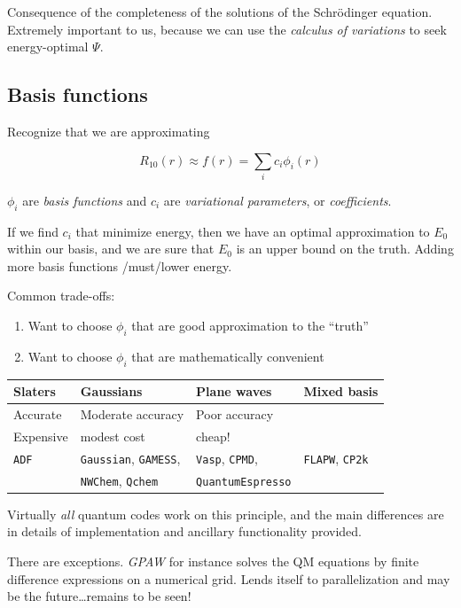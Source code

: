 \documentclass[11pt]{article}
\begin{document}
Consequence of the completeness of the solutions of the Schr\"{o}dinger equation.  Extremely important to us, because we can use the \emph{calculus of variations} to seek energy-optimal \(\Psi\).

\subsection{Basis functions}
\label{sec:org78bfcad}
Recognize that we are approximating

\[R_{10}(r) \approx f(r) = \sum_i c_i \phi_i(r)\]

\(\phi_i\) are \emph{basis functions} and \(c_i\) are \emph{variational parameters}, or \emph{coefficients}.

If we find \(c_i\) that minimize energy, then we have an optimal approximation to \(E_0\) within our basis, and we are sure that \(E_0\) is an upper bound on the truth.  Adding more basis functions /must/lower energy.

Common trade-offs:
\begin{enumerate}
\item Want to choose \(\phi_i\) that are good approximation to the ``truth''
\item Want to choose \(\phi_i\) that are mathematically convenient
\end{enumerate}

\begin{center}
\begin{tabular}{llll}
Slaters & Gaussians & Plane waves & Mixed basis\\
\hline
Accurate & Moderate accuracy & Poor accuracy & \\
Expensive & modest cost & cheap! & \\
\texttt{ADF} & \texttt{Gaussian}, \texttt{GAMESS}, & \texttt{Vasp}, \texttt{CPMD}, & \texttt{FLAPW}, \texttt{CP2k}\\
 & \texttt{NWChem}, \texttt{Qchem} & \texttt{QuantumEspresso} & \\
\end{tabular}
\end{center}

Virtually \emph{all} quantum codes work on this principle, and the main
differences are in details of implementation and ancillary
functionality provided.

There are exceptions. \emph{GPAW} for instance solves the QM equations by finite difference expressions on a numerical grid.  Lends itself to parallelization and may be the future\ldots remains to be seen!
\end{document}
